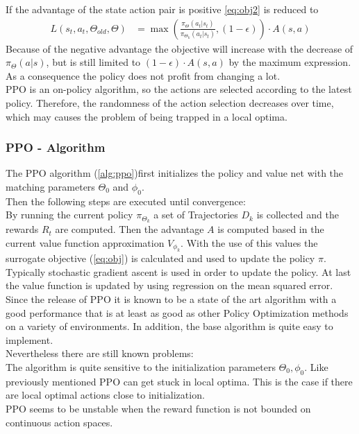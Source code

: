 If the advantage of the state action pair is positive \cref{eq:obj2} is reduced to 
\begin{align}
	L(s_t, a_t, \Theta_{old}, \Theta) &= \max (\frac{\pi_{\Theta}(a_t|s_t)}{\pi_{\Theta_k}(a_t|s_t)}, (1 - \epsilon)) \cdot A(s,a)
\end{align}
Because of the negative advantage the objective will increase with the decrease of $\pi_{\Theta} (a|s)$, but is still limited to $(1 - \epsilon) \cdot A(s,a)$ by the maximum expression.\\
As a consequence the policy does not profit from changing a lot.\\
PPO is an on-policy algorithm, so the actions are selected according to the latest policy. Therefore, the randomness of the action selection decreases over time, which may causes the problem of being trapped in a local optima.

\newpage
\subsubsection{PPO - Algorithm}
The PPO algorithm (\cref{alg:ppo})first initializes the policy and value net with the matching parameters $\Theta_0$ and $\phi_0$.\\
Then the following steps are executed until convergence:\\
By running the current policy $\pi_{\Theta_k}$ a set of Trajectories $D_k$ is collected and the rewards $R_t$ are computed. Then the advantage $A$ is computed based in the current value function approximation $V_{\phi_k}$. With the use of this values the surrogate objective (\cref{eq:obj}) is calculated and used to update the policy $\pi$. Typically stochastic gradient ascent is used in order to update the policy. At last the value function is updated by using regression on the mean squared error.\\
\newline
Since the release of PPO it is known to be a state of the art algorithm with a good performance that is at least as good as other Policy Optimization methods on a variety of environments. In addition, the base algorithm is quite easy to implement.\\
Nevertheless there are still known problems:\\
The algorithm is quite sensitive to the initialization parameters $\Theta_0, \phi_0$. Like previously mentioned PPO can get stuck in local optima. This is the case if there are local optimal actions close to initialization.\\
PPO seems to be unstable when the reward function is not bounded on continuous action spaces. 

